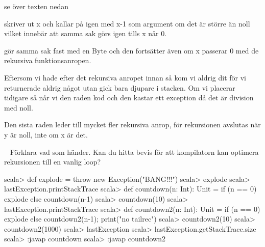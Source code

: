 \SOLUTION

\TaskSolved \what \TODO se över texten nedan

\SubtaskSolved
{} skriver ut x och kallar på  igen med x-1 som argument om det är större än noll vilket innebär att samma sak görs igen tills x når 0.

 gör samma sak fast med en Byte och den fortsätter även om x passerar 0 med de rekursiva funktionsanropen.

\SubtaskSolved
Eftersom vi hade  efter det rekursiva anropet innan så kom vi aldrig dit för vi returnerade aldrig något utan gick bara djupare i stacken. Om vi placerar  tidigare så når vi den raden kod och den kastar ett exception då det är division med noll.

\SubtaskSolved
Den sista raden leder till mycket fler rekursiva anrop, för rekursionen avslutas när y är noll, inte om x är det.

\QUESTEND





\QUESTBEGIN

\Task  \what~  Förklara vad som händer. Kan du hitta bevis för att kompilatorn kan optimera rekursionen till en vanlig loop?

\begin{REPL}
scala> def explode = throw new Exception("BANG!!!")
scala> explode
scala> lastException.printStackTrace
scala> def countdown(n: Int): Unit =
         if (n == 0) explode else countdown(n-1)
scala> countdown(10)
scala> lastException.printStackTrace
scala> def countdown2(n: Int): Unit =
         if (n == 0) explode else {countdown2(n-1); print("no tailrec")}
scala> countdown2(10)
scala> countdown2(1000)
scala> lastException
scala> lastException.getStackTrace.size
scala> :javap countdown
scala> :javap countdown2
\end{REPL}

\SOLUTION

\TaskSolved \what~\TODO %

\QUESTEND




\QUESTBEGIN

